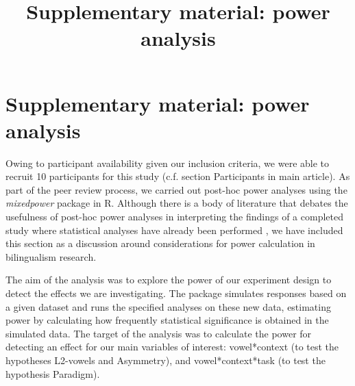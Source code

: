 \documentclass[12 pt]{article}
\title{Supplementary material: power analysis}
\date{}
\begin{document}
	

\section*{Supplementary material: power analysis}

Owing to participant availability given our inclusion criteria, we were able to recruit 10 participants for this study (c.f. section Participants in main article). As part of the peer review process, we carried out post-hoc power analyses using the \textit{mixedpower} package \citep{kumle2021estimating} in R. Although there is a body of literature that debates the usefulness of post-hoc power analyses in interpreting the findings of a completed study where statistical analyses have already been performed \citep{lakens_2021,dziak2020interpretation,lenth2007post,gelman2019observed_effect_size}, we have included this section as a discussion around considerations for power calculation in bilingualism research. 

The aim of the analysis was to explore the power of our experiment design to detect the effects we are investigating. The package simulates responses based on a given dataset and runs the specified analyses on these new data, estimating power by calculating how frequently statistical significance is obtained in the simulated data. The target of the analysis was to calculate the power for detecting an effect for our main variables of interest: vowel*context (to test the hypotheses L2-vowels and Asymmetry), and vowel*context*task (to test the hypothesis Paradigm). 
\end{document}
